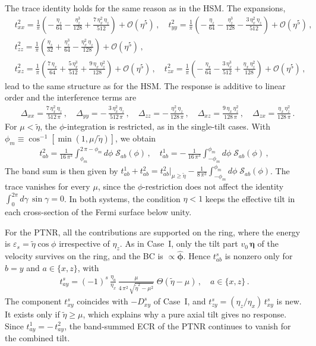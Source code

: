 \documentclass[aps,prb,onecolumn,nofootinbib,citeautoscript,10pt]{revtex4-2}
\newcommand{\bs}[1]{\boldsymbol{#1}}
\def \nn{\nonumber \\}
\begin{document}
 The trace identity holds for the same reason as in the HSM. The expansions,
\begin{align}
\label{eqvnrser}
& t^2_{xx} = \frac{1}{\pi} \left( -\,\frac{\eta_z}{64} - \frac{\eta_z^3}{128} 
+ \frac{7\,\eta_x^2\,\eta_z}{512} \right ) + \mathcal O(\eta^5)\,, \quad
t^2_{yy} = \frac{1}{\pi} \left ( -\,\frac{\eta_z}{64} - \frac{\eta_z^3}{128} 
- \frac{3\,\eta_x^2\,\eta_z}{512} \right) + \mathcal O(\eta^5)\,, \nn &
t^2_{zz} = \frac{1}{\pi} \left ( \frac{\eta_z}{32} + \frac{\eta_z^3}{64} - \frac{\eta_x^2\,\eta_z}{128} \right ) + \mathcal O(\eta^5)\,, \nn &
t^2_{xz} = \frac{1}{\pi} \left ( \frac{7\,\eta_x}{64} + \frac{5\,\eta_x^3}{512} + \frac{9\,\eta_x\,\eta_z^2}{128} \right ) + \mathcal O(\eta^5)\,, \quad
t^2_{zx} = \frac{1}{\pi} \left ( -\,\frac{\eta_x}{64} - \frac{3\,\eta_x^3}{512} 
+ \frac{\eta_x\,\eta_z^2}{128} \right) + \mathcal O(\eta^5)\,,
\end{align}
lead to the same structure as for the HSM. The response is additive to linear order and the interference terms are
\begin{align}
\label{eqvnrdelta}
& \Delta_{xx} = \frac{7\,\eta_x^2\,\eta_z}{512\,\pi}\,, \quad
\Delta_{yy} = -\,\frac{3\,\eta_x^2\,\eta_z}{512\,\pi}\,, \quad
\Delta_{zz} = -\,\frac{\eta_x^2\,\eta_z}{128\,\pi}\,, \quad
\Delta_{xz} = \frac{9\,\eta_x\,\eta_z^2}{128\,\pi}\,, \quad
\Delta_{zx} = \frac{\eta_x\,\eta_z^2}{128\,\pi}\,.
\end{align}
For $\mu<\tilde\eta$, the $\phi$-integration is restricted, as in the single-tilt cases. With $\phi_m\equiv\cos^{-1}\left[\min(1,\mu/\tilde\eta)\right]$, we obtain
\begin{align}
\label{eqvnrcombmu}
t^2_{ab} = \frac{1}{16\,\pi^3} \int_{\phi_m}^{2\,\pi-\phi_m} d\phi \;\mathscr S_{ab}(\phi) \,, \quad
t^1_{ab} = -\,\frac{1}{16\,\pi^3} \int_{-\phi_m}^{\phi_m} d\phi \;\mathscr S_{ab}(\phi) \,,
\end{align}
The band sum is then given by $t^1_{ab}+t^2_{ab}=t^2_{ab}\big|_{\mu\ge\tilde\eta}-\frac{1}{8\,\pi^3}\int_{-\phi_m}^{\phi_m} d\phi \;\mathscr S_{ab}(\phi)$. The trace vanishes for every $\mu$, since the $\phi$-restriction does not affect the identity $\int_0^{2\pi} d\gamma\,\sin\gamma=0$. In both systems, the condition $\eta<1$ keeps the effective tilt in each cross-section of the Fermi surface below unity.

For the PTNR, all the contributions are supported on the ring, where the energy is $\varepsilon_s=\tilde\eta\cos\phi$ irrespective of $\eta_z$. As in Case~I, only the tilt part $v_0\,\bs\eta$ of the velocity survives on the ring, and the BC is $\propto\hat{\bs\phi}$. Hence $t^s_{ab}$ is nonzero only for $b=y$ and $a\in\{x,z\}$, with
\begin{align}
\label{eqptnrcomb}
t^s_{ay} = (-1)^s\,\frac{\eta_a}{\eta_x}\,\frac{\mu}{4\,\pi^2\,\sqrt{\tilde\eta^2-\mu^2}}\;\Theta(\tilde\eta-\mu) \,, \quad a\in\{x,z\} \,.
\end{align}
The component $t^s_{xy}$ coincides with $-D^s_{xy}$ of Case~I, and $t^s_{zy}=(\eta_z/\eta_x)\,t^s_{xy}$ is new. It exists only if $\tilde\eta\ge\mu$, which explains why a pure axial tilt gives no response. Since $t^1_{ay}=-\,t^2_{ay}$, the band-summed ECR of the PTNR continues to vanish for the combined tilt.
\end{document}
